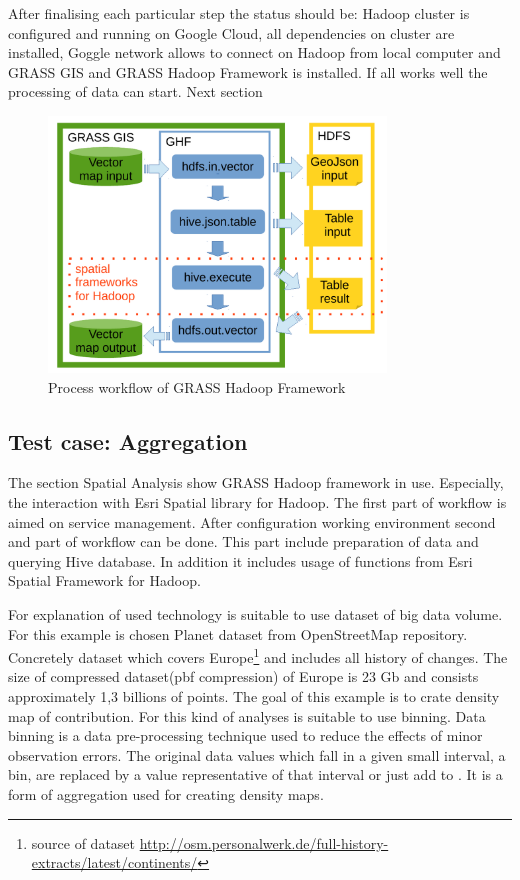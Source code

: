 \documentclass[a4paper,12pt,oneside]{report}
\begin{document}
	After finalising each particular step the status should be: Hadoop cluster is configured and running on Google Cloud, all dependencies on cluster are installed, Goggle network allows to connect on Hadoop from local computer and GRASS GIS and GRASS Hadoop Framework is installed. If all works well the processing of data can start. Next section 
	
		\begin{figure}[!htbp]
			\centering
			\includegraphics[width=0.8\textwidth]{./img/modules_schema.pdf}
			\caption[GHF workflow]{\centering Process workflow of GRASS Hadoop Framework 
			}
			\label{wokrflow}
		\end{figure} 
		
	
	\subsection{Test case: Aggregation}\label{spatial_anal_usage}
	The section Spatial Analysis show GRASS Hadoop framework in use. Especially, the interaction with Esri Spatial library for Hadoop. 
	The first part of workflow is aimed on service management. After configuration working environment  second and part of workflow can be done. This part include preparation of data and querying Hive database. In addition it includes usage of functions from Esri Spatial Framework for Hadoop.
	

	

	For explanation of used technology is suitable to use dataset of big data volume. For this 
	example is chosen Planet dataset from OpenStreetMap repository. Concretely dataset which covers Europe\footnote{source of dataset \url{http://osm.personalwerk.de/full-history-extracts/latest/continents/}} 
	and includes all history of changes. The size of compressed dataset(pbf compression) of 
	Europe is 23 Gb and consists approximately 1,3 billions of points.
	The goal of this example is to crate density map of contribution. For this kind of analyses is suitable to use binning. Data binning  is a data pre-processing technique used to reduce the effects of minor observation errors. The original data values which fall in a given small interval, a bin, are replaced by a value representative of that interval or just add to . It is a form of aggregation used for creating density maps.
\end{document}
